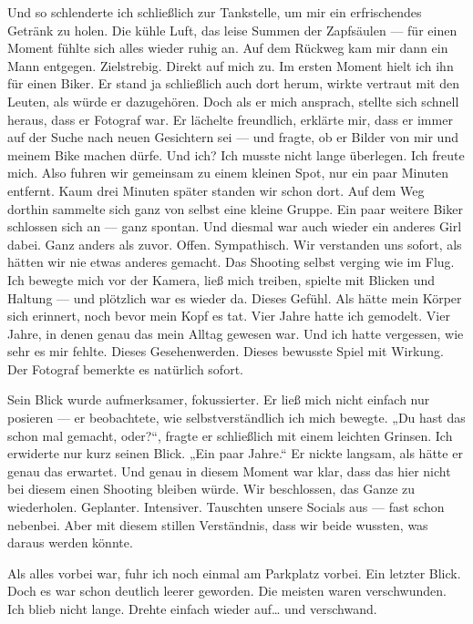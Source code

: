 Und so schlenderte ich schließlich zur Tankstelle, um mir ein erfrischendes Getränk zu holen.
Die kühle Luft, das leise Summen der Zapfsäulen — für einen Moment fühlte sich alles wieder ruhig an.
Auf dem Rückweg kam mir dann ein Mann entgegen.
Zielstrebig. Direkt auf mich zu.
Im ersten Moment hielt ich ihn für einen Biker.
Er stand ja schließlich auch dort herum, wirkte vertraut mit den Leuten, als würde er dazugehören.
Doch als er mich ansprach, stellte sich schnell heraus, dass er Fotograf war.
Er lächelte freundlich, erklärte mir, dass er immer auf der Suche nach neuen Gesichtern sei — und fragte, ob er Bilder von mir und meinem Bike machen dürfe.
Und ich?
Ich musste nicht lange überlegen.
Ich freute mich.
Also fuhren wir gemeinsam zu einem kleinen Spot, nur ein paar Minuten entfernt.
Kaum drei Minuten später standen wir schon dort.
Auf dem Weg dorthin sammelte sich ganz von selbst eine kleine Gruppe.
Ein paar weitere Biker schlossen sich an — ganz spontan.
Und diesmal war auch wieder ein anderes Girl dabei.
Ganz anders als zuvor.
Offen. Sympathisch.
Wir verstanden uns sofort, als hätten wir nie etwas anderes gemacht.
Das Shooting selbst verging wie im Flug.
Ich bewegte mich vor der Kamera, ließ mich treiben, spielte mit Blicken und Haltung —
und plötzlich war es wieder da.
Dieses Gefühl.
Als hätte mein Körper sich erinnert, noch bevor mein Kopf es tat.
Vier Jahre hatte ich gemodelt.
Vier Jahre, in denen genau das mein Alltag gewesen war.
Und ich hatte vergessen, wie sehr es mir fehlte.
Dieses Gesehenwerden.
Dieses bewusste Spiel mit Wirkung.
Der Fotograf bemerkte es natürlich sofort.

Sein Blick wurde aufmerksamer, fokussierter.
Er ließ mich nicht einfach nur posieren — er beobachtete, wie selbstverständlich ich mich bewegte.
„Du hast das schon mal gemacht, oder?“, fragte er schließlich mit einem leichten Grinsen.
Ich erwiderte nur kurz seinen Blick.
„Ein paar Jahre.“
Er nickte langsam, als hätte er genau das erwartet.
Und genau in diesem Moment war klar,
dass das hier nicht bei diesem einen Shooting bleiben würde.
Wir beschlossen, das Ganze zu wiederholen.
Geplanter. Intensiver.
Tauschten unsere Socials aus — fast schon nebenbei.
Aber mit diesem stillen Verständnis,
dass wir beide wussten, was daraus werden könnte.

Als alles vorbei war, fuhr ich noch einmal am Parkplatz vorbei.
Ein letzter Blick.
Doch es war schon deutlich leerer geworden.
Die meisten waren verschwunden.
Ich blieb nicht lange.
Drehte einfach wieder auf…
und verschwand.

